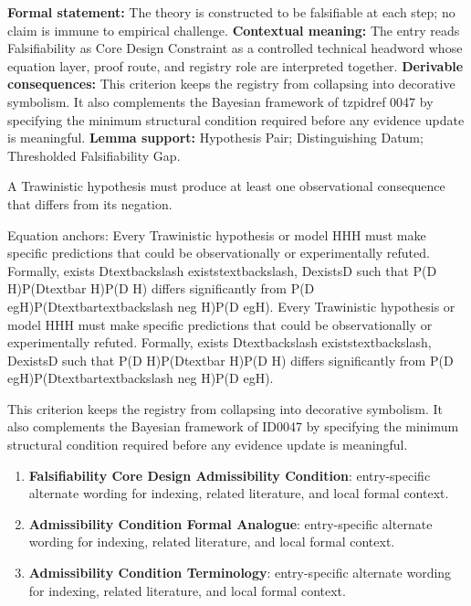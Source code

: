 \begingroup\footnotesize\setlength{\emergencystretch}{3em}\sloppy
\textbf{Formal statement:} The theory is constructed to be falsifiable at each step; no claim is immune to empirical challenge. \textbf{Contextual meaning:} The entry reads Falsifiability as Core Design Constraint as a controlled technical headword whose equation layer, proof route, and registry role are interpreted together. \textbf{Derivable consequences:} This criterion keeps the registry from collapsing into decorative symbolism. It also complements the Bayesian framework of tzpidref 0047 by specifying the minimum structural condition required before any evidence update is meaningful. \textbf{Lemma support:} Hypothesis Pair; Distinguishing Datum; Thresholded Falsifiability Gap.\par
\endgroup

A Trawinistic hypothesis must produce at least one observational consequence that differs from its negation.

Equation anchors: Every Trawinistic hypothesis or model HHH must make specific predictions that could be observationally or experimentally refuted. Formally, exists Dtextbackslash existstextbackslash, DexistsD such that P(D H)P(Dtextbar H)P(D H) differs significantly from P(D  egH)P(Dtextbartextbackslash neg H)P(D  egH). Every Trawinistic hypothesis or model HHH must make specific predictions that could be observationally or experimentally refuted. Formally, exists Dtextbackslash existstextbackslash, DexistsD such that P(D H)P(Dtextbar H)P(D H) differs significantly from P(D  egH)P(Dtextbartextbackslash neg H)P(D  egH).

This criterion keeps the registry from collapsing into decorative symbolism. It also complements the Bayesian framework of ID0047 by specifying the minimum structural condition required before any evidence update is meaningful.
\endgroup

\begingroup\footnotesize\sloppy
\begin{enumerate}[leftmargin=1.35em,itemsep=1pt,topsep=1pt,parsep=0pt]
\item \textbf{Falsifiability Core Design Admissibility Condition}: entry-specific alternate wording for indexing, related literature, and local formal context.
\item \textbf{Admissibility Condition Formal Analogue}: entry-specific alternate wording for indexing, related literature, and local formal context.
\item \textbf{Admissibility Condition Terminology}: entry-specific alternate wording for indexing, related literature, and local formal context.
\end{enumerate}
\endgroup

